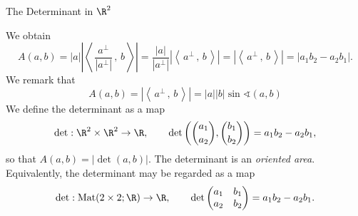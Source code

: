 \documentclass[smaller,hyperref={CJKbookmarks=true}]{beamer}
\newcommand{\scp}[2]{\left\langle\,#1\,,\,#2\,\right\rangle} \newcommand{\scpp}{\langle\,\cdot\,,\,\cdot\,\rangle}
\begin{document}
\begin{frame}[t,shrink]{The Determinant in $\R^2$}
\begin{spacing}{1.05}
We obtain
\[A(a,b)=|a|\left|\scp{\frac{a^{\perp}}{|a^{\perp}|}}{b}\right|=\frac{|a|}{|a^{\perp}|}|\scp{a^{\perp}}{b}|=|\scp{a^{\perp}}{b}|=|a_1b_2-a_2b_1|.\]
We remark that
\[A(a,b)=|\scp{a^{\perp}}{b}|=|a||b|\sin\sphericalangle(a,b)\]
We define the determinant as a map
\setcounter{equation}{0}
\begin{equation}\label{eq26}
  \det:\R^2\times\R^2\to\R,\qquad\det\left(\binom{a_1}{a_2},\binom{b_1}{b_2}\right)=a_1b_2-a_2b_1,
\end{equation}
so that $A(a,b)=|\det(a,b)|$. The determinant is an \emph{oriented area}.\\
Equivalently, the determinant may be regarded as a map
\begin{equation}\label{eq27}
  \det:\text{Mat}(2\times 2;\R)\to\R,\qquad\det\begin{pmatrix}
                         a_1 & b_1 \\
                         a_2 & b_2
                       \end{pmatrix}=a_1b_2-a_2b_1.
\end{equation}
\end{spacing}
\end{frame}
\end{document}
